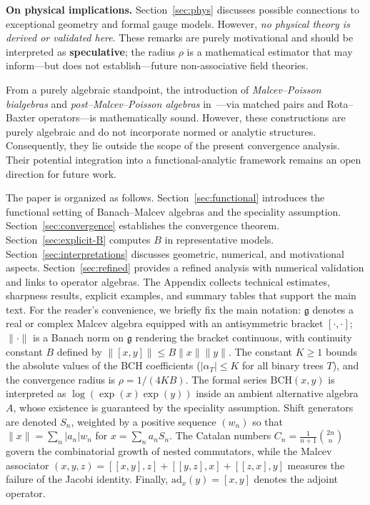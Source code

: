 \documentclass[11pt]{amsart}
\numberwithin{equation}{section}
\theoremstyle{remark}
\begin{document}
\medskip

\textbf{On physical implications.} Section~\ref{sec:phys} discusses possible connections to exceptional geometry and formal gauge models. However, \textit{no physical theory is derived or validated here}. These remarks are purely motivational and should be interpreted as \textbf{speculative}; the radius $\rho$ is a mathematical estimator that may inform—but does not establish—future non-associative field theories.

\medskip

From a purely algebraic standpoint, the introduction of \emph{Malcev–Poisson bialgebras} and \emph{post--Malcev--Poisson algebras} in~\cite{HarrathiMabroukNawelSilvestrov2025}—via matched pairs and Rota–Baxter operators—is mathematically sound. However, these constructions are purely algebraic and do not incorporate normed or analytic structures. Consequently, they lie outside the scope of the present convergence analysis. Their potential integration into a functional-analytic framework remains an open direction for future work.

\medskip

The paper is organized as follows. Section~\ref{sec:functional} introduces the functional setting of Banach--Malcev algebras and the speciality assumption. Section~\ref{sec:convergence} establishes the convergence theorem. Section~\ref{sec:explicit-B} computes $B$ in representative models. Section~\ref{sec:interpretations} discusses geometric, numerical, and motivational aspects. Section~\ref{sec:refined} provides a refined analysis with numerical validation and links to operator algebras. The Appendix collects technical estimates, sharpness results, explicit examples, and summary tables that support the main text.
For the reader’s convenience, we briefly fix the main notation: $\mathfrak{g}$ denotes a real or complex Malcev algebra equipped with an antisymmetric bracket $[\cdot,\cdot]$; $\|\cdot\|$ is a Banach norm on $\mathfrak{g}$ rendering the bracket continuous, with continuity constant $B$ defined by $\|[x,y]\| \leq B\|x\|\|y\|$. The constant $K \geq 1$ bounds the absolute values of the BCH coefficients ($|\alpha_T| \leq K$ for all binary trees $T$), and the convergence radius is $\rho = 1/(4KB)$. The formal series $\mathrm{BCH}(x,y)$ is interpreted as $\log(\exp(x)\exp(y))$ inside an ambient alternative algebra $A$, whose existence is guaranteed by the speciality assumption. Shift generators are denoted $S_n$, weighted by a positive sequence $(w_n)$ so that $\|x\| = \sum_n |a_n| w_n$ for $x = \sum_n a_n S_n$. The Catalan numbers $C_n = \frac{1}{n+1}\binom{2n}{n}$ govern the combinatorial growth of nested commutators, while the Malcev associator $(x,y,z) = [[x,y],z] + [[y,z],x] + [[z,x],y]$ measures the failure of the Jacobi identity. Finally, $\mathrm{ad}_x(y) = [x,y]$ denotes the adjoint operator.
\end{document}
